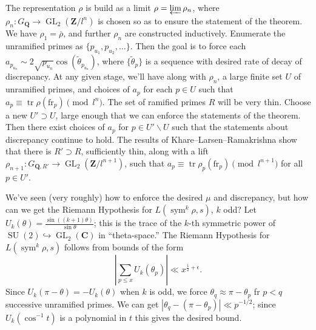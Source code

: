 \documentclass{article}
\DeclareMathOperator{\GL}{GL}
\DeclareMathOperator{\SU}{SU}
\DeclareMathOperator{\sym}{sym}
\DeclareMathOperator{\tr}{tr}
\newcommand{\bC}{\mathbf{C}}
\newcommand{\bQ}{\mathbf{Q}}
\newcommand{\bZ}{\mathbf{Z}}
\newcommand{\frob}{\mathrm{fr}}
\begin{document}
The representation $\rho$ is build as a limit $\rho = \varprojlim \rho_n$, 
where $\rho_n\colon G_\bQ \to \GL_2(\bZ/l^n)$ is chosen so as to ensure the 
statement of the theorem. We have $\rho_1 = \bar\rho$, and further $\rho_n$ 
are constructed inductively. Enumerate the unramified primes as 
$\{p_{u_1},p_{u_2},\dots\}$. Then the goal is to force each 
$a_{p_{u_n}} \sim 2\sqrt{p_{u_n}} \cos(\widetilde \theta_{p_{u_n}})$, where 
$\{\widetilde\theta_p\}$ is a sequence with desired rate of decay of 
discrepancy. At any given stage, we'll have along with $\rho_n$, a large finite 
set $U$ of unramified primes, and choices of $a_p$ for each $p\in U$ such that 
$a_p\equiv \tr\rho(\frob_p)\pmod{l^n}$. The set of ramified primes $R$ will be 
very thin. Choose a new $U'\supset U$, large enough that we can enforce the 
statements of the theorem. Then there exist choices of $a_p$ for 
$p\in U'\smallsetminus U$ such that the statements about discrepancy continue 
to hold. The results of Khare--Larsen--Ramakrishna show that there is 
$R'\supset R$, sufficiently thin, along with a lift 
$\rho_{n+1}\colon G_{\bQ,R'}\to \GL_2(\bZ/l^{n+1})$, such that 
$a_p\equiv\tr\rho_p(\frob_p)\pmod{l^{n+1}}$ for all $p\in U'$. 

We've seen (very roughly) how to enforce the desired $\mu$ and discrepancy, but 
how can we get the Riemann Hypothesis for $L(\sym^k \rho,s)$, $k$ odd? Let 
$U_k(\theta) = \frac{\sin((k+1)\theta)}{\sin\theta}$; this is the trace of the 
$k$-th symmetric power of $\SU(2)\hookrightarrow \GL_2(\bC)$ in 
``theta-space.'' The Riemann Hypothesis for $L(\sym^k \rho,s)$ follows from 
bounds of the form 
\[
	\left| \sum_{p\leqslant x} U_k(\theta_p)\right| \ll x^{\frac 1 2+\epsilon} .
\]
Since $U_k(\pi - \theta) = - U_k(\theta)$ when $k$ is odd, 
we force $\theta_q \approx \pi - \theta_p$ fr $p<q$ successive 
unramified primes. We can get 
$\left|\theta_q - (\pi - \theta_p)\right| \ll p^{-1/2}$; 
since $U_k(\cos^{-1} t)$ is a polynomial in $t$ this gives the desired bound. 
\end{document}
